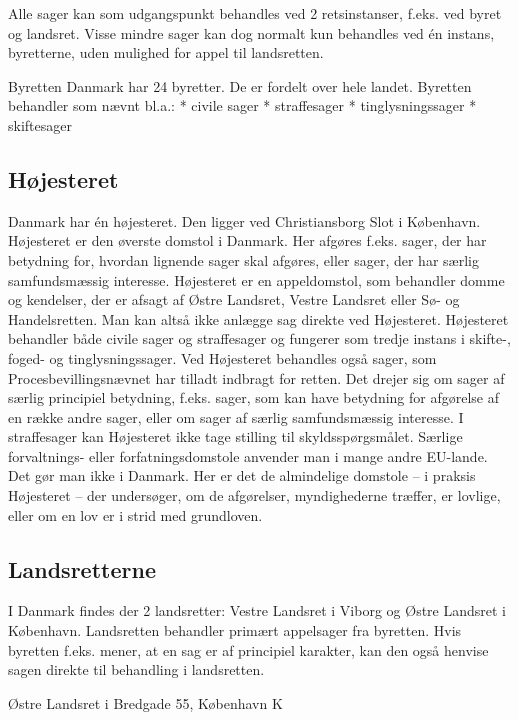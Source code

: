 \documentclass[]{book}
\begin{document}
Alle sager kan som udgangspunkt behandles ved 2 retsinstanser, f.eks. ved byret og landsret. Visse mindre sager kan dog normalt kun behandles ved én instans, byretterne, uden mulighed for appel til landsretten.

Byretten
Danmark har 24 byretter. De er fordelt over hele landet. Byretten behandler som nævnt bl.a.:
* civile sager
* straffesager
* tinglysningssager
* skiftesager

\hypertarget{hjesteret}{%
\subsection{Højesteret}\label{hjesteret}}

Danmark har én højesteret. Den ligger ved Christiansborg Slot i København. Højesteret er den øverste domstol i Danmark. Her afgøres f.eks. sager, der har betydning for, hvordan lignende sager skal afgøres, eller sager, der har særlig samfundsmæssig interesse.
Højesteret er en appeldomstol, som behandler domme og kendelser, der er afsagt af Østre Landsret, Vestre Landsret eller Sø- og Handelsretten. Man kan altså ikke anlægge sag direkte ved Højesteret.
Højesteret behandler både civile sager og straffesager og fungerer som tredje instans i skifte-, foged- og tinglysningssager. Ved Højesteret behandles også sager, som Procesbevillingsnævnet har tilladt indbragt for retten. Det drejer sig om sager af særlig principiel betydning, f.eks. sager, som kan have betydning for afgørelse af en række andre sager, eller om sager af særlig samfundsmæssig interesse.
I straffesager kan Højesteret ikke tage stilling til skyldsspørgsmålet.
Særlige forvaltnings- eller forfatningsdomstole anvender man i mange andre EU-lande. Det gør man ikke i Danmark. Her er det de almindelige domstole -- i praksis Højesteret -- der undersøger, om de afgørelser, myndighederne træffer, er lovlige, eller om en lov er i strid med grundloven.

\hypertarget{landsretterne}{%
\subsection{Landsretterne}\label{landsretterne}}

I Danmark findes der 2 landsretter: Vestre Landsret i Viborg og Østre Landsret i København. Landsretten behandler primært appelsager fra byretten.
Hvis byretten f.eks. mener, at en sag er af principiel karakter, kan den også henvise sagen direkte til behandling i landsretten.

Østre Landsret i Bredgade 55, København K
\end{document}

